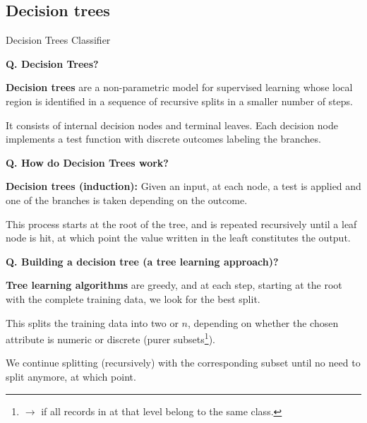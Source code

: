 \subsection{Decision trees}
\begin{transitionsubframe}
  \begin{center}
    \Huge Decision Trees Classifier
  \end{center}
\end{transitionsubframe}


\begin{frame}[fragile]{\textbf{Q. Decision Trees?}}
  \begin{wideitemize}
  \item \textbf{Decision trees} are a non-parametric model for supervised learning
    whose local region is identified in a sequence of recursive splits in a smaller
    number of steps.
  \item It consists of internal decision nodes and terminal leaves.
    Each decision node implements a test function with discrete outcomes labeling
    the branches.
  \end{wideitemize}
\end{frame}

\begin{frame}[fragile]{\textbf{Q. How do Decision Trees work?}}
  \begin{wideitemize}
  \item \textbf{Decision trees (induction):} Given an input, at each node, a test is applied
    and one of the branches is taken depending on the outcome.
  \item This process starts at the root of the tree, and is repeated recursively until
    a leaf node is hit, at which point the value written in the leaft constitutes
    the output.    
  \end{wideitemize}
\end{frame}


\begin{frame}[fragile]{\textbf{Q. Building a decision tree (a tree learning approach)?}}
  \begin{wideitemize}
  \item \textbf{Tree learning algorithms} are greedy, and at each step, starting at the
    root with the complete training data, we look for the best split.
  \item This splits the training data into two or $n$, depending
    on whether the chosen attribute is numeric or discrete (purer
    subsets\footnote{$\rightarrow$ if all records in at that level belong to the same class.}).
  \item We continue splitting (recursively) with the corresponding subset until
    no need to split anymore, at which point.
  \end{wideitemize}
\end{frame}



